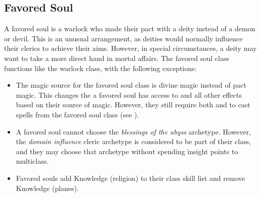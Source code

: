     \subsection{Favored Soul}
        A favored soul is a warlock who made their pact with a deity instead of a demon or devil.
        This is an unusual arrangement, as deities would normally influence their clerics to achieve their aims.
        However, in special circumstances, a deity may want to take a more direct hand in mortal affairs.
        The favored soul class functions like the warlock class, with the following exceptions:
        \begin{itemize}
            \item The magic source for the favored soul class is divine magic instead of pact magic.
                This changes the  a favored soul has access to and all other effects based on their source of magic.
                However, they still require both  and  to cast spells from the favored soul class (see ).
            \item A favored soul cannot choose the \textit{blessings of the abyss} archetype. However, the \textit{domain influence} cleric archetype is considered to be part of their class, and they may choose that archetype without spending insight points to multiclass.
            \item Favored souls add Knowledge (religion) to their class skill list and remove Knowledge (planes).
        \end{itemize}

